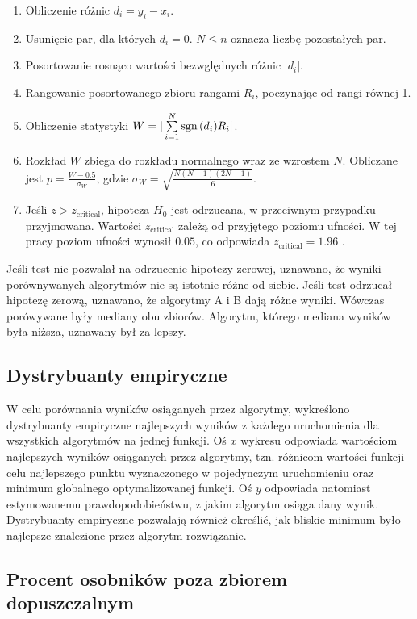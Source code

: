 \documentclass[a4paper,onecolumn,oneside,12pt,wide,floatssmall]{mwrep}
\def\sgn{{\rm sgn}\,}
\theoremstyle{definition}
\theoremstyle{plain}%
\theoremstyle{remark}
\begin{document}
\begin{enumerate}
 \item Obliczenie różnic $d_i = y_i - x_i$.
 \item Usunięcie par, dla których $d_i = 0$. $N \leq n$ oznacza liczbę pozostałych par.
 \item Posortowanie rosnąco wartości bezwględnych różnic $|d_i|$.
 \item Rangowanie posortowanego zbioru rangami $R_i$, poczynając od rangi równej 1. 
 \item Obliczenie statystyki $W = |\sum\limits_{i=1}^{N} \sgn(d_i)R_i|$.
 \item Rozkład $W$ zbiega do rozkładu normalnego wraz ze wzrostem $N$. Obliczane jest
 $p = \frac{W - 0.5}{\sigma_W}$, gdzie $\sigma_W = \sqrt{\frac{N(N+1)(2N+1)}{6}}.$ 
 \item Jeśli $z > z_\text{critical}$, hipoteza $H_0$ jest odrzucana, w przeciwnym przypadku -- przyjmowana. 
Wartości $z_\text{critical}$ zależą od przyjętego poziomu ufności. 
W tej pracy poziom ufności wynosił $0.05$, co odpowiada $z_\text{critical}=1.96$ \cite{lowry}.  
\end{enumerate}

Jeśli test nie pozwalał na odrzucenie hipotezy zerowej, uznawano, że wyniki porównywanych algorytmów
nie są istotnie różne od siebie. 
Jeśli test odrzucał hipotezę zerową, uznawano, że algorytmy A i B dają różne wyniki.
Wówczas porówywane były mediany obu zbiorów. Algorytm, którego mediana wyników była niższa,
uznawany był za lepszy.

\subsection{Dystrybuanty empiryczne}
\label{sec:dystrybuanty}

W celu porównania wyników osiąganych przez algorytmy, 
wykreślono dystrybuanty empiryczne najlepszych wyników z każdego uruchomienia 
dla wszystkich algorytmów na jednej funkcji. Oś $x$ wykresu
odpowiada wartościom najlepszych wyników osiąganych przez algorytmy, 
tzn. różnicom wartości funkcji celu najlepszego
punktu wyznaczonego w pojedynczym uruchomieniu 
oraz minimum globalnego optymalizowanej funkcji. Oś $y$ odpowiada natomiast 
estymowanemu prawdopodobieństwu, z jakim algorytm osiąga dany wynik. 
Dystrybuanty empiryczne pozwalają również
określić, jak bliskie minimum było najlepsze znalezione przez algorytm rozwiązanie.

\subsection{Procent osobników poza zbiorem dopuszczalnym}
\end{document}
